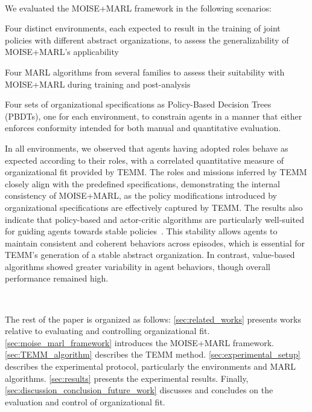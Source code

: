 \documentclass[conference]{IEEEtran}
\begin{document}
\

We evaluated the MOISE+MARL framework in the following scenarios:
\begin{enumerate*}[label={\roman*) },itemjoin={; \quad}]
  \item Four distinct environments, each expected to result in the training of joint policies with different abstract organizations, to assess the generalizability of MOISE+MARL's applicability~\cite{rashid2018qmix, overcookedai}
  \item Four MARL algorithms from several families to assess their suitability with MOISE+MARL during training and post-analysis~\cite{yu2021mappo, lowe2017multi}
  \item Four sets of organizational specifications as Policy-Based Decision Trees (PBDTs), one for each environment, to constrain agents in a manner that either enforces conformity intended for both manual and quantitative evaluation.
\end{enumerate*}

In all environments, we observed that agents having adopted roles behave as expected according to their roles, with a correlated quantitative measure of organizational fit provided by TEMM. 
The roles and missions inferred by TEMM closely align with the predefined specifications, demonstrating the internal consistency of MOISE+MARL, as the policy modifications introduced by organizational specifications are effectively captured by TEMM.
The results also indicate that policy-based and actor-critic algorithms are particularly well-suited for guiding agents towards stable policies~\cite{yu2021mappo, achiam2017cpo}. 
This stability allows agents to maintain consistent and coherent behaviors across episodes, which is essential for TEMM's generation of a stable abstract organization. 
In contrast, value-based algorithms showed greater variability in agent behaviors, though overall performance remained high.

\

\noindent The rest of the paper is organized as follows: \autoref{sec:related_works} presents works relative to evaluating and controlling organizational fit. \autoref{sec:moise_marl_framework} introduces the MOISE+MARL framework. \autoref{sec:TEMM_algorithm} describes the TEMM method. \autoref{sec:experimental_setup} describes the experimental protocol, particularly the environments and MARL algorithms. \autoref{sec:results} presents the experimental results. Finally, \autoref{sec:discussion_conclusion_future_work} discusses and concludes on the evaluation and control of organizational fit.
\end{document}
